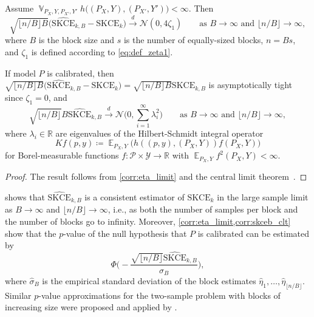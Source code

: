 \documentclass{article}
\DeclareMathOperator{\Exp}{\mathbb{E}}
\DeclareMathOperator{\Var}{\mathbb{V}}
\begin{document}
\begin{corollary}\label{corr:skceb_clt}
Assume $\Var_{P_X,Y,P_{X'},Y'} h\big((P_X, Y), (P_{X'}, Y')\big) < \infty$.
Then
\begin{equation}\label{eq:skceb_asymptotics_general}
    \sqrt{\lfloor n / B \rfloor B} \big(\widehat{\mathrm{SKCE}}_{k,B} - \mathrm{SKCE}_k\big)
    \xrightarrow{d} \mathcal{N}(0, 4 \zeta_1) \qquad \text{as } B \to \infty \text{ and } \lfloor n / B \rfloor \to \infty,
\end{equation}
where $B$ is the block size and $s$ is the number of equally-sized blocks, $n = Bs$,
and $\zeta_1$ is defined according to \cref{eq:def_zeta1}.

If model $P$ is calibrated, then
$\sqrt{\lfloor n / B \rfloor B}\big(\widehat{\mathrm{SKCE}}_{k,B} - \mathrm{SKCE}_k\big)
= \sqrt{\lfloor n / B \rfloor B} \widehat{\mathrm{SKCE}}_{k,B}$
is
asymptotically tight since $\zeta_1 = 0$, and
\begin{equation*}
    \sqrt{\lfloor n / B \rfloor} B\widehat{\mathrm{SKCE}}_{k,B} \xrightarrow{d} \mathcal{N}\bigg(0, \sum_{i=1}^\infty \lambda_i^2\bigg) \qquad \text{as } B \to \infty \text{ and } \lfloor n / B \rfloor \to \infty,
\end{equation*}
where $\lambda_i \in \mathbb{R}$ are eigenvalues of the Hilbert-Schmidt integral
operator
\begin{equation*}
    K f(p, y) \coloneqq \Exp_{P_X,Y}\big(h((p, y), (P_X, Y)) f(P_X, Y)\big)
\end{equation*}
for Borel-measurable functions
$f \colon \mathcal{P} \times \mathcal{Y} \to \mathbb{R}$
with $\Exp_{P_X,Y} f^2(P_X, Y) < \infty$.
\end{corollary}

\begin{proof}
    The result follows from \cref{corr:eta_limit}
    and the central limit theorem~\citep[see, e.g.,][Theorem~A in Section~1.9]{Serfling1980}.    
\end{proof}

\begin{remark}\label{remark:skceb_increasing}
     shows that $\widehat{\mathrm{SKCE}}_{k,B}$ is a consistent estimator
    of $\mathrm{SKCE}_k$ in the large sample limit as $B \to \infty$ and
    $\lfloor n / B \rfloor \to \infty$, i.e., as both the number of samples per block and the
    number of blocks go to infinity. Moreover, \cref{corr:eta_limit,corr:skceb_clt} show that
    the $p$-value of the null hypothesis that $P$ is calibrated can be estimated by
    \begin{equation*}
        \Phi\bigg(- \frac{\sqrt{\lfloor n / B \rfloor}\widehat{\mathrm{SKCE}}_{k,B}}{\widehat{\sigma}_B} \bigg),
    \end{equation*}
    where $\widehat{\sigma}_B$ is the empirical standard deviation of the
    block estimates $\widehat{\eta}_1,\ldots, \widehat{\eta}_{\lfloor n / B \rfloor}$.
    Similar $p$-value approximations for the two-sample problem with blocks of increasing
    size were proposed and applied by \citet{Zaremba2013}.
\end{remark}
\end{document}
